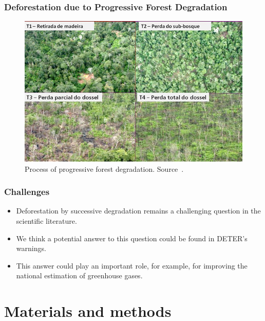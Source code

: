 \documentclass[aspectratio=169]{beamer}
\begin{document}
\begin{frame}
    \frametitle{Deforestation due to Progressive Forest Degradation}
    \begin{figure}[h] 
        \includegraphics[width=0.72\linewidth]
        {images/progressive_degradation_photo.png}
        \caption{Process of progressive forest degradation.
        Source~\cite{dealmeida2022}.}
    \end{figure}
\end{frame}

\begin{frame}
    \frametitle{Challenges}
    \begin{itemize}
        \item Deforestation by successive degradation remains a challenging 
            question in the scientific literature.
        \item We think a potential answer to this question could be found in 
            DETER's warnings.
        \item This answer could play an important role, for example, for 
            improving the national estimation of greenhouse gases.
    \end{itemize}
\end{frame}

\section{Materials and methods}

\end{document}
